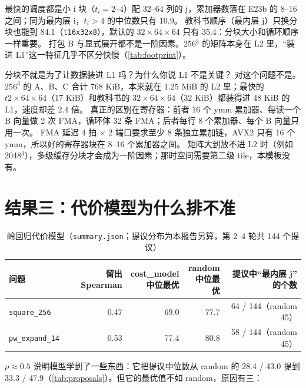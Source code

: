 \documentclass[11pt,a4paper]{ctexart}
\newcommand{\sk}[1]{\texttt{#1}}
\begin{document}
\begin{findingbox}[：瓶颈在寄存器，不在 L1]
最快的调度都是小 i 块（$t_i=2$--$4$）配 32--64 列的 j，累加器数落在 E23b 的 8--16 之间；同为最内层 i，$t_i>4$ 的中位数只有 10.9。
教科书顺序（最内层 j）只换分块也能到 84.1（\sk{t16x32x8}），默认的 $32\times64\times64$ 只有 35.4：分块大小和循环顺序一样重要。
打包 B 与显式展开都不是一阶因素。256$^3$ 的矩阵本身在 L2 里，“装进 L1”这一特征几乎不区分快慢（\cref{tab:footprint}）。
\end{findingbox}

\begin{iqbox}{分块不就是为了让数据装进 L1 吗？为什么你说 L1 不是关键？}
对这个问题不是。$256^3$ 的 A、B、C 合计 768 KiB，本来就在 1.25 MiB 的 L2 里；最快的 $t2\times64\times64$（17 KiB）和教科书的 $32\times64\times64$（32 KiB）都装得进 48 KiB 的 L1，速度却差 2.4 倍。
真正的区别在寄存器：前者 16 个 ymm 累加器、每读一个 B 向量做 2 次 FMA，循环体 32 条 FMA；后者每行 8 个累加器、每个 B 向量只用一次。
FMA 延迟 4 拍 × 2 端口要求至少 8 条独立累加链，AVX2 只有 16 个 ymm，所以好的寄存器块在 8--16 个累加器之间。
矩阵大到放不进 L2 时（例如 2048$^3$），多级缓存分块才会成为一阶因素；那时空间需要第二级 tile，本模板没有。
\end{iqbox}

\section{结果三：代价模型为什么排不准}\label{sec:model}

\begin{table}[H]
\centering\small
\caption{岭回归代价模型（\texttt{summary.json}；提议分布为本报告另算，第 2--4 轮共 144 个提议）}\label{tab:model}
\begin{tabular}{lrrrr}
\toprule
问题 & 留出 Spearman & \makecell[r]{cost\_model\\中位最优} & \makecell[r]{random\\中位最优} & \makecell[r]{提议中“最内层 j”\\的个数} \\
\midrule
\sk{square\_256} & 0.47 & 69.0 & 77.7 & 64 / 144（random 45） \\
\sk{pw\_expand\_14} & 0.53 & 77.4 & 80.8 & 58 / 144（random 45） \\
\bottomrule
\end{tabular}
\end{table}

$\rho\approx0.5$ 说明模型学到了一些东西：它把提议中位数从 random 的 28.4 / 43.0 提到 33.3 / 47.9（\cref{tab:proposals}）。但它的最优值不如 random，原因有三：
\end{document}

